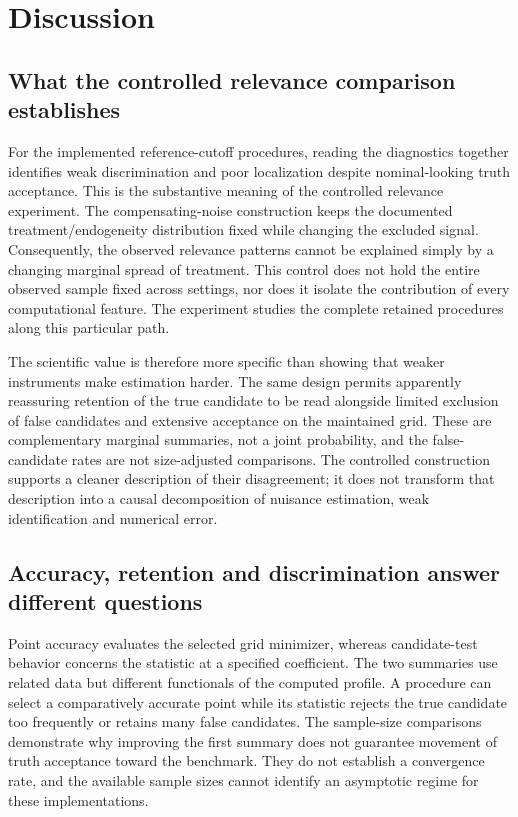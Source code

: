 \section{Discussion}
\label{sec:results-overall-interpretation}
\subsection{What the controlled relevance comparison establishes}
For the implemented reference-cutoff procedures, reading the diagnostics together identifies weak discrimination and poor localization despite nominal-looking truth acceptance. This is the substantive meaning of the controlled relevance experiment. The compensating-noise construction keeps the documented treatment/endogeneity distribution fixed while changing the excluded signal. Consequently, the observed relevance patterns cannot be explained simply by a changing marginal spread of treatment. This control does not hold the entire observed sample fixed across settings, nor does it isolate the contribution of every computational feature. The experiment studies the complete retained procedures along this particular path.

The scientific value is therefore more specific than showing that weaker instruments make estimation harder. The same design permits apparently reassuring retention of the true candidate to be read alongside limited exclusion of false candidates and extensive acceptance on the maintained grid. These are complementary marginal summaries, not a joint probability, and the false-candidate rates are not size-adjusted comparisons. The controlled construction supports a cleaner description of their disagreement; it does not transform that description into a causal decomposition of nuisance estimation, weak identification and numerical error.

\subsection{Accuracy, retention and discrimination answer different questions}
Point accuracy evaluates the selected grid minimizer, whereas candidate-test behavior concerns the statistic at a specified coefficient. The two summaries use related data but different functionals of the computed profile. A procedure can select a comparatively accurate point while its statistic rejects the true candidate too frequently or retains many false candidates. The sample-size comparisons demonstrate why improving the first summary does not guarantee movement of truth acceptance toward the benchmark. They do not establish a convergence rate, and the available sample sizes cannot identify an asymptotic regime for these implementations.

